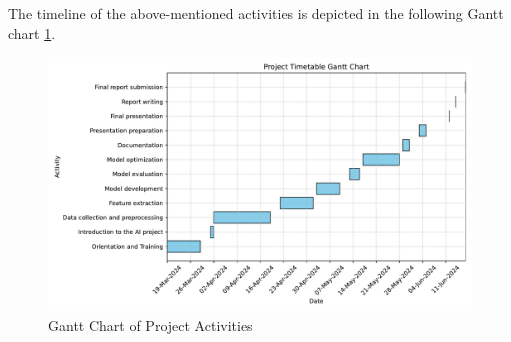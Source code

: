The timeline of the above-mentioned activities is depicted in the following
Gantt chart \ref{fig:gantt-chart}.

\begin{figure}[H]
    \centering
    \includegraphics[width=\textwidth]{../figs/gantt_chart.pdf}
    \caption{Gantt Chart of Project Activities}
    \label{fig:gantt-chart}
\end{figure}